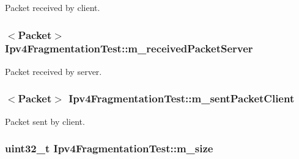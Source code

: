 Packet received by client. 

\subsubsection[{\texorpdfstring{m\+\_\+received\+Packet\+Server}{m_receivedPacketServer}}]{$<${\bf Packet}$>$ Ipv4\+Fragmentation\+Test\+::m\+\_\+received\+Packet\+Server\hspace{0.3cm}{\ttfamily [private]}}\hypertarget{classIpv4FragmentationTest_a1cda7da1e37a2413ce73e54a395ecf4a}{}\label{classIpv4FragmentationTest_a1cda7da1e37a2413ce73e54a395ecf4a}


Packet received by server. 

\subsubsection[{\texorpdfstring{m\+\_\+sent\+Packet\+Client}{m_sentPacketClient}}]{$<${\bf Packet}$>$ Ipv4\+Fragmentation\+Test\+::m\+\_\+sent\+Packet\+Client\hspace{0.3cm}{\ttfamily [private]}}\hypertarget{classIpv4FragmentationTest_a2101eb6eb2f3da7f4ba981a08fbf84e0}{}\label{classIpv4FragmentationTest_a2101eb6eb2f3da7f4ba981a08fbf84e0}


Packet sent by client. 

\subsubsection[{\texorpdfstring{m\+\_\+size}{m_size}}]{\setlength{\rightskip}{0pt plus 5cm}uint32\+\_\+t Ipv4\+Fragmentation\+Test\+::m\+\_\+size\hspace{0.3cm}{\ttfamily [private]}}\hypertarget{classIpv4FragmentationTest_a2fa502a8c06dc3e751cacbf31e687251}{}\label{classIpv4FragmentationTest_a2fa502a8c06dc3e751cacbf31e687251}



